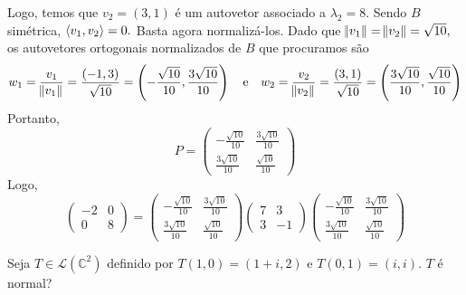 \documentclass[11pt,a4paper]{article}
\begin{document}
{{Logo, temos que $v_2 = (3,1)$ é um autovetor associado a $\lambda_2 = 8.$ 
Sendo $B$ simétrica, $\left\langle v_1, v_2 \right\rangle = 0.$ Basta agora normalizá-los. Dado que $\norm{v_1} = \norm{v_2} = \sqrt{10},$ os autovetores ortogonais normalizados de $B$ que procuramos são
\[
w_1 = \frac{v_1}{\norm{v_1}} = \frac{(-1,3)}{\sqrt{10}} = \left(-\frac{\sqrt{10}}{10}, \frac{3 \sqrt{10}}{10} \right) \quad \mbox{e} \quad w_2 = \frac{v_2}{\norm{v_2}} = \frac{(3,1)}{\sqrt{10}} = \left(\frac{3\sqrt{10}}{10}, \frac{ \sqrt{10}}{10} \right) 
\]
Portanto, 
\[
P = \begin{pmatrix}
-\frac{\sqrt{10}}{10} & \frac{3\sqrt{10}}{10} \\
\frac{3 \sqrt{10}}{10} & \frac{\sqrt{10}}{10} 
\end{pmatrix}
\]
Logo,
\[
 \begin{pmatrix}
-2 & 0 \\
0 & 8
\end{pmatrix} = \begin{pmatrix}
-\frac{\sqrt{10}}{10} & \frac{3\sqrt{10}}{10} \\
\frac{3 \sqrt{10}}{10} & \frac{\sqrt{10}}{10} 
\end{pmatrix}
 \begin{pmatrix}
7 & 3 \\
3 & -1
\end{pmatrix}
\begin{pmatrix}
-\frac{\sqrt{10}}{10} & \frac{3\sqrt{10}}{10} \\
\frac{3 \sqrt{10}}{10} & \frac{\sqrt{10}}{10}  
\end{pmatrix}
\]
} 
}

\begin{exercicio}
 
Seja $T \in \mathcal{L}(\mathbb{C}^2)$ definido por $T(1, 0) = (1 + i, 2)$ e $T(0, 1) = (i, i).$ $T$ é normal?
\end{exercicio}
\end{document}
